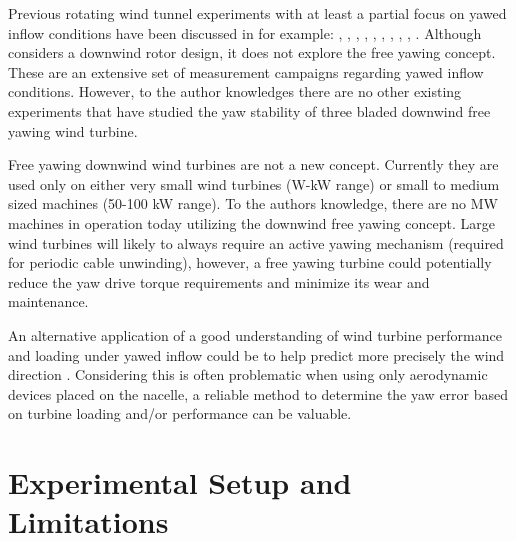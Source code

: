 \documentclass[a4paper]{jpconf}
\begin{document}

Previous rotating wind tunnel experiments with at least a partial focus on yawed inflow conditions have been discussed in for example: \cite{haans_measurement_2005}, \cite{haans_measurement_2005-1}, \cite{bracchi_downwind_2014}, \cite{schepers_engineering_2012}, \cite{schepers_final_2012}, \cite{mexnext_iea_web}, \cite{schepers_model_2007}, \cite{hand_unsteady_2001}, \cite{loland_wind_2011}, \cite{haans_wind_2011}. Although \cite{bracchi_downwind_2014} considers a downwind rotor design, it does not explore the free yawing concept. These are an extensive set of measurement campaigns regarding yawed inflow conditions. However, to the author knowledges there are no other existing experiments that have studied the yaw stability of three bladed downwind free yawing wind turbine.


Free yawing downwind wind turbines are not a new concept. Currently they are used only on either very small wind turbines (W-kW range) or small to medium sized machines (50-100 kW range). To the authors knowledge, there are no MW machines in operation today utilizing the downwind free yawing concept. Large wind turbines will likely to always require an active yawing mechanism (required for periodic cable unwinding), however, a free yawing turbine could potentially reduce the yaw drive torque requirements and minimize its wear and maintenance.

An alternative application of a good understanding of wind turbine performance and loading under yawed inflow could be to help predict more precisely the wind direction \cite{bottasso_validation_2015}. Considering this is often problematic when using only aerodynamic devices placed on the nacelle, a reliable method to determine the yaw error based on turbine loading and/or performance can be valuable.


\section{Experimental Setup and Limitations}
\end{document}
